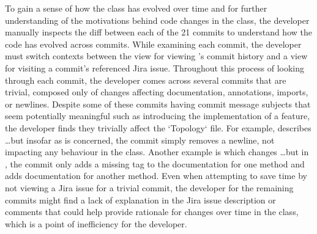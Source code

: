 To gain a sense of how the class has evolved over time and for further understanding of the motivations behind code changes in the class, the developer manually inspects the diff between each of the 21 commits to understand how the code has evolved across commits.
While examining each commit, the developer must switch contexts between the view for viewing 's commit history and a view for visiting a commit's referenced Jira issue.
Throughout this process of looking through each commit, the developer comes across several commits that are trivial, composed only of changes affecting documentation, annotations, imports, or newlines. 
Despite some of these commits having commit message subjects that seem potentially meaningful such as introducing the implementation of a feature, the developer finds they trivially affect the `Topology` file. 
For example, \colorbox{lightgray}{} describes \dots but insofar as  is concerned, the commit simply removes a newline, not impacting any behaviour in the class. 
Another example is \colorbox{lightgray}{} which changes \dots but in , the commit only adds a missing  tag to the documentation for one method and adds documentation for another method.
Even when attempting to save time by not viewing a Jira issue for a trivial commit, the developer for the remaining commits might find a lack of explanation in the Jira issue description or comments that could help provide rationale for changes over time in the  class, which is a point of inefficiency for the developer.

